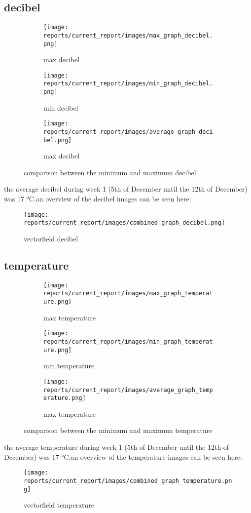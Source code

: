 \subsection{decibel} 
\begin{figure}[hbt!] 
\begin{subfigure}{0.3\textwidth} 
\texttt{[image: reports/current\_report/images/max\_graph\_decibel.png]}  
\caption{max decibel}  
\end{subfigure} 
\begin{subfigure}{0.3\textwidth} 
\texttt{[image: reports/current\_report/images/min\_graph\_decibel.png]}  
\caption{min decibel}  
\end{subfigure} 
\begin{subfigure}{0.3\textwidth} 
\texttt{[image: reports/current\_report/images/average\_graph\_decibel.png]}  
\caption{max decibel}  
\end{subfigure} 
\caption{comparison between the minimum and maximum decibel}  
\end{figure} 
\FloatBarrier  
the average decibel during week 1 (5th of December until the 12th of December) was 17 °C.an overview of the decibel images can be seen here:\begin{SCfigure}[0.5][hbt!]
\texttt{[image: reports/current\_report/images/combined\_graph\_decibel.png]}  
\caption{vectorfield decibel}  
\end{SCfigure} 
\FloatBarrier  
\subsection{temperature} 
\begin{figure}[hbt!] 
\begin{subfigure}{0.3\textwidth} 
\texttt{[image: reports/current\_report/images/max\_graph\_temperature.png]}  
\caption{max temperature}  
\end{subfigure} 
\begin{subfigure}{0.3\textwidth} 
\texttt{[image: reports/current\_report/images/min\_graph\_temperature.png]}  
\caption{min temperature}  
\end{subfigure} 
\begin{subfigure}{0.3\textwidth} 
\texttt{[image: reports/current\_report/images/average\_graph\_temperature.png]}  
\caption{max temperature}  
\end{subfigure} 
\caption{comparison between the minimum and maximum temperature}  
\end{figure} 
\FloatBarrier  
the average temperature during week 1 (5th of December until the 12th of December) was 17 °C.an overview of the temperature images can be seen here:\begin{SCfigure}[0.5][hbt!]
\texttt{[image: reports/current\_report/images/combined\_graph\_temperature.png]}  
\caption{vectorfield temperature}  
\end{SCfigure} 
\FloatBarrier  
